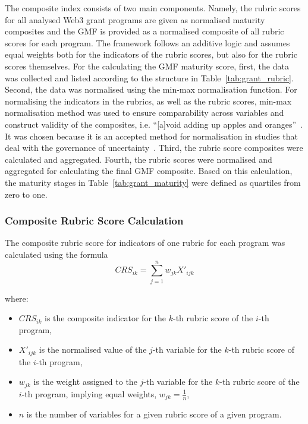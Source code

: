 \documentclass[conference]{IEEEtran}
\begin{document}
The composite index consists of two main components. Namely, the rubric scores for all analysed Web3 grant programs are given as normalised maturity composites and the GMF is provided as a normalised composite of all rubric scores for each program. The framework follows an additive logic and assumes equal weights both for the indicators of the rubric scores, but also for the rubric scores themselves. For the calculating the GMF maturity score, first, the data was collected and listed according to the structure in Table~\ref{tab:grant_rubric}. Second, the data was normalised using the min-max normalisation function. For normalising the indicators in the rubrics, as well as the rubric scores, min-max normalisation method was used to ensure comparability across variables and construct validity of the composites, i.e. “[a]void adding up apples and oranges”~\cite[p.~27]{oecd_handbook_2008}. It was chosen because it is an accepted method for normalisation in studies that deal with the governance of uncertainty~\cite{winters_when_2004}. Third, the rubric score composites were calculated and aggregated. Fourth, the rubric scores were normalised and aggregated for calculating the final GMF composite. Based on this calculation, the maturity stages in Table~\ref{tab:grant_maturity} were defined as quartiles from zero to one.\\

\subsubsection{Composite Rubric Score Calculation}\label{sec_3.2.1}

The composite rubric score for indicators of one rubric for each program was calculated using the formula
\footnotesize
\[
CRS_{ik} = \sum_{j=1}^{n} w_{jk} X'_{ijk}
\]

where:

\begin{itemize}
    \item \( CRS_{ik} \) is the composite indicator for the \( k \)-th rubric score of the \( i \)-th program,
    \item \( X'_{ijk} \) is the normalised value of the \( j \)-th variable for the \( k \)-th rubric score of the \( i \)-th program,
    \item \( w_{jk} \) is the weight assigned to the \( j \)-th variable for the \( k \)-th rubric score of the \( i \)-th program, implying equal weights, \( w_{jk} = \frac{1}{n} \),
    \item \( n \) is the number of variables for a given rubric score of a given program.
\end{itemize}\vspace{7pt}
\normalsize
\end{document}
